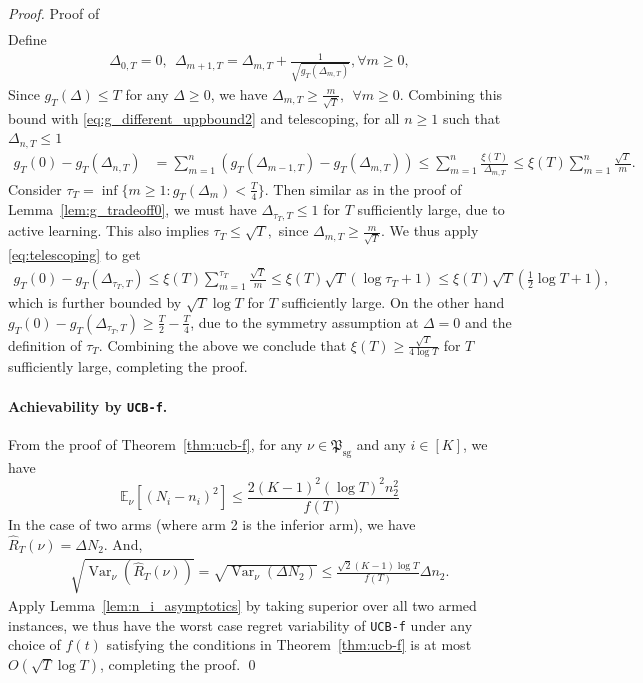\documentclass[nonblindrev]{informs3_noinforms}
\newcommand{\var}{\operatorname{Var}}
\newcommand{\E}{{\mathbb{E}}}
\begin{document}
\begin{proof}{Proof of }
\begin{align}
    \end{align}
    Define 
    \begin{align}\label{eq:Delta_sequence2}
        \Delta_{0, T}=0, \ \ \Delta_{m+1, T}=\Delta_{m, T}+\frac{1}{\sqrt{g_T(\Delta_{m, T})}}, \forall m \ge 0,
    \end{align}
    Since $g_T(\Delta) \le T$ for any $\Delta \ge 0$, we have $\Delta_{m, T}\geq\frac{m}{\sqrt T}, \ \ \forall m \ge 0$. Combining this bound with  \eqref{eq:g_different_uppbound2} and telescoping, for all $n\geq 1$ such that $\Delta_{n, T} \le 1$
    \begin{align}\label{eq:telescoping}
        g_T(0)-g_T(\Delta_{n, T})&=\sum_{m=1}^{n}(g_T(\Delta_{m-1, T})-g_T(\Delta_{m, T})) \leq \sum_{m=1}^n\frac{\xi(T)}{\Delta_{m, T}}\leq\xi(T)\sum_{m=1}^n\frac{\sqrt{T}}{m}.
    \end{align}
    Consider $\tau_T = \inf\{m \ge 1: g_T(\Delta_m) < \frac{T}{4} \}$. Then similar as in the proof of Lemma~\ref{lem:g_tradeoff0}, we must have $\Delta_{\tau_T, T} \le 1$ for $T$ sufficiently large, due to active learning. This also implies $\tau_T \le \sqrt{T},$ since $\Delta_{m, T} \ge \frac{m}{\sqrt{T}}$. We thus apply \eqref{eq:telescoping} to get
    \begin{align*}
        g_T(0) - g_T(\Delta_{\tau_T, T}) \le \xi(T) \sum_{m = 1}^{\tau_T} \frac{\sqrt{T}}{m} \le \xi(T)\sqrt{T}\left(\log\tau_T + 1 \right) \leq \xi(T)\sqrt{T}\left(\frac{1}{2}\log T + 1 \right),
    \end{align*}
    which is further bounded by $\sqrt{T}\log T$ for $T$ sufficiently large. On the other hand
    $g_T(0) - g_T(\Delta_{\tau_T, T}) \ge \frac{T}{2} - \frac{T}{4}$, due to the symmetry assumption at $\Delta = 0$ and the definition of $\tau_T$. Combining the above we conclude that 
    $\xi(T) \ge \frac{\sqrt{T}}{4 \log T}$ for $T$ sufficiently large, completing the proof.   

    \paragraph{Achievability by \texttt{UCB-f}.} From the proof of Theorem~\ref{thm:ucb-f}, for any $\nu \in \mathfrak{P}_{\text{sg}}$ and any $i \in [K]$, we have 
    \[
    \E_{\nu}[(N_i - n_i)^2] \le \frac{2(K-1)^2(\log T)^2 n_2^2 }{f(T)}
    \]
    In the case of two arms (where arm 2 is the inferior arm), we have 
    $\hat R_T(\nu) = \Delta N_2$. And,
    \begin{align*}
        \sqrt{\var_{\nu}(\hat R_T(\nu))} = \sqrt{\var_{\nu}(\Delta N_2)} \le \frac{\sqrt{2}(K-1) \log T}{f(T)}\Delta n_2.
    \end{align*}
    Apply Lemma~\ref{lem:n_i_asymptotics} by taking superior over all two armed instances, we thus have the worst case regret variability of \texttt{UCB-f} under any choice of $f(t)$ satisfying the conditions in Theorem~\ref{thm:ucb-f} is at most $O(\sqrt{T}\log T)$, completing the proof.   \qed
    \end{proof}
\end{document}
